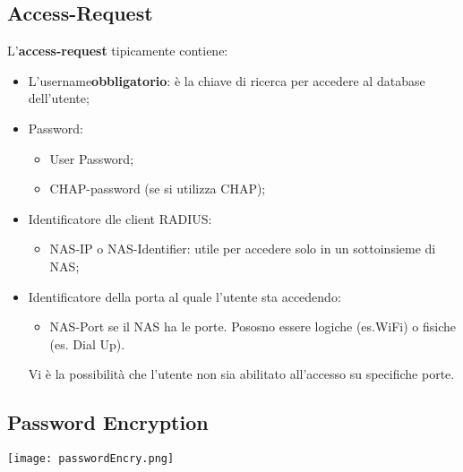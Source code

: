 \documentclass{article}
\theoremstyle{remark}
\begin{document}
\subsection{Access-Request}
L'\textbf{access-request} tipicamente contiene:\begin{itemize}
    \item L'username\textbf{obbligatorio}: è la chiave di ricerca per accedere al database dell'utente;
    \item Password:\begin{itemize}
        \item User Password;
        \item CHAP-password (se si utilizza CHAP);
    \end{itemize}
    \item Identificatore dle client RADIUS:\begin{itemize}
        \item NAS-IP o NAS-Identifier: utile per accedere solo in un sottoinsieme di NAS;
    \end{itemize}
    \item Identificatore della porta al quale l'utente sta accedendo:\begin{itemize}
        \item NAS-Port se il NAS ha le porte. Pososno essere logiche (es.WiFi) o fisiche (es. Dial Up).
    \end{itemize}
    Vi è la possibilità che l'utente non sia abilitato all'accesso su specifiche porte.
\end{itemize}
\subsection{Password Encryption}
\begin{center}
    \texttt{[image: passwordEncry.png]}
\end{center}
\end{document}
